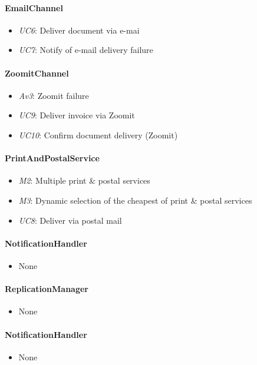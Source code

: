 \documentclass[a4paper,10pt]{article}
\begin{document}
\paragraph{EmailChannel}
\begin{itemize}
	\item \emph{UC6}: Deliver document via e-mai
	\item \emph{UC7}: Notify of e-mail delivery failure
\end{itemize}

\paragraph{ZoomitChannel}
\begin{itemize}
	\item \emph{Av3}: Zoomit failure
	\item \emph{UC9}: Deliver invoice via Zoomit
	\item \emph{UC10}: Confirm document delivery (Zoomit)
\end{itemize}

\paragraph{PrintAndPostalService}
\begin{itemize}
	\item \emph{M2}: Multiple print \& postal services
	\item \emph{M3}: Dynamic selection of the cheapest of print \& postal services
	\item \emph{UC8}: Deliver via postal mail
\end{itemize}

\paragraph{NotificationHandler}
\begin{itemize}
	\item None
\end{itemize}

\paragraph{ReplicationManager}
\begin{itemize}
	\item None
\end{itemize}

\paragraph{NotificationHandler}
\begin{itemize}
	\item None
\end{itemize}
\end{document}
